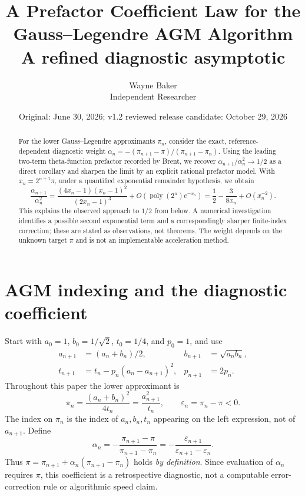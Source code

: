 \documentclass[11pt]{article}
\title{A Prefactor Coefficient Law for the Gauss--Legendre AGM Algorithm\\\large A refined diagnostic asymptotic}
\author{Wayne Baker\\\small Independent Researcher}
\date{Original: June 30, 2026; v1.2 reviewed release candidate: October 29, 2026}
\theoremstyle{definition}\newtheorem{remark}{Remark}\newtheorem{observation}{Numerical Observation}
\begin{document}
\maketitle
\begin{abstract}
For the lower Gauss--Legendre approximants $\pi_n$, consider the exact, reference-dependent diagnostic weight
$\alpha_n=-(\pi_{n+1}-\pi)/(\pi_{n+1}-\pi_n)$. Using the leading two-term theta-function prefactor recorded by Brent, we recover $\alpha_{n+1}/\alpha_n^2\to1/2$ as a direct corollary and sharpen the limit by an explicit rational prefactor model. With $x_n=2^{n+1}\pi$, under a quantified exponential remainder hypothesis, we obtain
\[
\frac{\alpha_{n+1}}{\alpha_n^2}
=\frac{(4x_n-1)(x_n-1)^2}{(2x_n-1)^3}
+O(\operatorname{poly}(2^n)e^{-x_n})
=\frac12-\frac{3}{8x_n}+O(x_n^{-2}).
\]
This explains the observed approach to $1/2$ from below. A numerical investigation identifies a possible second exponential term and a correspondingly sharper finite-index correction; these are stated as observations, not theorems. The weight depends on the unknown target $\pi$ and is not an implementable acceleration method.
\end{abstract}
\section{AGM indexing and the diagnostic coefficient}
Start with $a_0=1$, $b_0=1/\sqrt2$, $t_0=1/4$, and $p_0=1$, and use
\[
\begin{aligned}
a_{n+1}&=(a_n+b_n)/2,&b_{n+1}&=\sqrt{a_nb_n},\\
t_{n+1}&=t_n-p_n(a_n-a_{n+1})^2,&p_{n+1}&=2p_n.
\end{aligned}
\]
Throughout this paper the lower approximant is
\[
\pi_n=\frac{(a_n+b_n)^2}{4t_n}=\frac{a_{n+1}^2}{t_n},\qquad
\varepsilon_n=\pi_n-\pi<0.
\]
The index on $\pi_n$ is the index of $a_n,b_n,t_n$ appearing on the left expression, not of $a_{n+1}$. Define
\[
\alpha_n=-\frac{\pi_{n+1}-\pi}{\pi_{n+1}-\pi_n}
=-\frac{\varepsilon_{n+1}}{\varepsilon_{n+1}-\varepsilon_n}.
\]
Thus $\pi=\pi_{n+1}+\alpha_n(\pi_{n+1}-\pi_n)$ holds \emph{by definition}. Since evaluation of $\alpha_n$ requires $\pi$, this coefficient is a retrospective diagnostic, not a computable error-correction rule or algorithmic speed claim.
\end{document}
